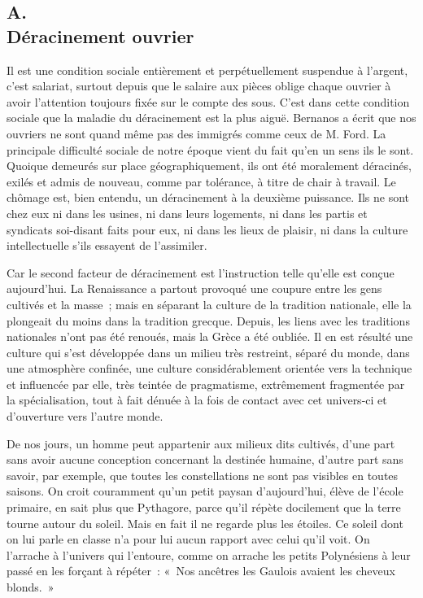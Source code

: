 \documentclass[french,twoside]{book} %
\begin{document}
\subsection[{A. Déracinement ouvrier}]{A. \\
Déracinement ouvrier}
\noindent \par
Il est une condition sociale entièrement et perpétuellement suspendue à l'argent, c'est salariat, surtout depuis que le salaire aux pièces oblige chaque ouvrier à avoir l'attention toujours fixée sur le compte des sous. C'est dans cette condition sociale que la maladie du déracinement est la plus aiguë. Bernanos a écrit que nos ouvriers ne sont quand même pas des immigrés comme ceux de M. Ford. La principale difficulté sociale de notre époque vient du fait qu'en un sens ils le sont. Quoique demeurés sur place géographiquement, ils ont été moralement déracinés, exilés et admis de nouveau, comme par tolérance, à titre de chair à travail. Le chômage est, bien entendu, un déracinement à la deuxième puissance. Ils ne sont chez eux ni dans les usines, ni dans leurs logements, ni dans les partis et syndicats soi-disant faits pour eux, ni dans les lieux de plaisir, ni dans la culture intellectuelle s'ils essayent de l'assimiler.\par
Car le second facteur de déracinement est l’instruction telle qu'elle est conçue aujourd'hui. La Renaissance a partout provoqué une coupure entre les gens cultivés et la masse ; mais en séparant la culture de la tradition nationale, elle la plongeait du moins dans la tradition grecque. Depuis, les liens avec les traditions nationales n'ont pas été renoués, mais la Grèce a été oubliée. Il en est résulté une culture qui s'est développée dans un milieu très restreint, séparé du monde, dans une atmosphère confinée, une culture considérablement orientée vers la technique et influencée par elle, très teintée de pragmatisme, extrêmement fragmentée par la spécialisation, tout à fait dénuée à la fois de contact avec cet univers-ci et d'ouverture vers l'autre monde.\par
De nos jours, un homme peut appartenir aux milieux dits cultivés, d'une part sans avoir aucune conception concernant la destinée humaine, d'autre part sans savoir, par exemple, que toutes les constellations ne sont pas visibles en toutes saisons. On croit couramment qu’un petit paysan d'aujourd'hui, élève de l'école primaire, en sait plus que Pythagore, parce qu'il répète docilement que la terre tourne autour du soleil. Mais en fait il ne regarde plus les étoiles. Ce soleil dont on lui parle en classe n'a pour lui aucun rapport avec celui qu'il voit. On l'arrache à l'univers qui l'entoure, comme on arrache les petits Polynésiens à leur passé en les forçant à répéter : « Nos ancêtres les Gaulois avaient les cheveux blonds. »\par
\end{document}
